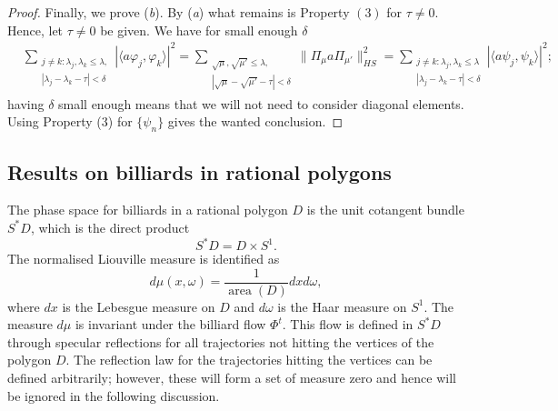 \documentclass[11pt,twoside,reqno]{amsart}
\renewcommand{\phi}{\varphi}
\newcommand{\1}{\mathrm{\mathbf{1}}}
\DeclareMathOperator{\area}{area}
\numberwithin{equation}{section}
\theoremstyle{plain}
\theoremstyle{definition}
\theoremstyle{remark}
\begin{document}
\begin{proof}
    Finally, we prove (\emph{b}). By (\emph{a}) what remains is Property $(3)$ for $\tau\neq 0$. Hence, let $\tau\neq 0$ be given. We have for small enough $\delta$
    \begin{align*}
        &
        \sum_{ \substack{ j \neq k : \lambda_j , \lambda_k \leq \lambda, \\ | \lambda_j - \lambda_k - \tau| < \delta} } | \langle a \phi_j, \phi_k  \rangle |^2 = \sum_{\substack{ \sqrt{\mu}, \sqrt{\mu'} \leq \lambda, \\ | \sqrt{\mu} - \sqrt{\mu'} - \tau | < \delta }} \| \Pi_\mu a  \Pi_{\mu'} \|_{HS}^2 = \sum_{ \substack{ j \neq k : \lambda_j , \lambda_k \leq \lambda \\ | \lambda_j - \lambda_k - \tau| < \delta} } | \langle a \psi_j, \psi_k  \rangle |^2
        ;
    \end{align*}
    having $\delta$ small enough means that we will not need to consider diagonal elements. Using Property (3) for $\{ \psi_n\}$ gives the wanted conclusion.   
\end{proof}

\subsection{Results on billiards in rational polygons}
The phase space for billiards in a rational polygon $D$ is the unit cotangent bundle $S^{*}D$, which is the direct product 
\begin{equation*}
    S^{*}D = D\times S^1.
\end{equation*}
The normalised Liouville measure is identified as
\begin{equation*}
    d\mu(x,\omega) = \frac{1}{\area(D)} dx d\omega,
\end{equation*}
where $dx$ is the Lebesgue measure on $D$ and $d\omega$ is the Haar measure on $S^1$. The measure $d\mu$ is invariant under the billiard flow $\Phi^t$. This flow is defined in $S^{*}D$ through specular reflections for all trajectories not hitting the vertices of the polygon $D$. The reflection law for the trajectories hitting the vertices can be defined arbitrarily; however, these will form a set of measure zero and hence will be ignored in the following discussion. 
\end{document}
